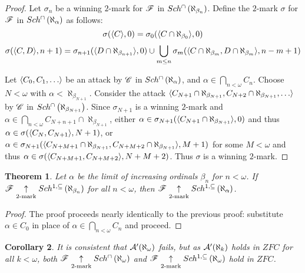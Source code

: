 \documentclass{amsart}
\theoremstyle{plain}
\newtheorem{theorem}{Theorem}
\newtheorem{corollary}[theorem]{Corollary}
\theoremstyle{definition}
\theoremstyle{remark}
\theoremstyle{plain}
\theoremstyle{definition}
\theoremstyle{remark}
\begin{document}
  \begin{proof}
    Let \(\sigma_n\) be a winning \(2\)-mark for \(\mathscr{F}\) in
    \(Sch^{\cap}\left({\aleph_{\beta_n}}\right)\). Define the \(2\)-mark \(\sigma\)
    for \(\mathscr{F}\) in \(Sch^{\cap}\left({\aleph_\alpha}\right)\) as follows:
    \[
      \sigma(\langle C\rangle,0)
        =
      \sigma_0(\langle C\cap\aleph_{\beta_0}\rangle,0)
    \]
    \[
      \sigma(\langle C,D\rangle,n+1)
        =
      \sigma_{n+1}(\langle D\cap\aleph_{\beta_{n+1}}\rangle,0)
        \cup
      \bigcup_{m\leq n}
      \sigma_m(\langle C\cap\aleph_{\beta_m},D\cap\aleph_{\beta_m}\rangle,n-m+1)
    \]

    Let \(\<C_0,C_1,\dots\>\) be an attack by
    \(\mathscr{C}\) in \(Sch^{\cap}\left({\aleph_\alpha}\right)\), and
    \(\alpha\in\bigcap_{n<\omega}C_n\).
    Choose \(N<\omega\) with \(\alpha<\aleph_{\beta_{N+1}}\). Consider the
    attack
    \(\<C_{N+1}\cap\aleph_{\beta_{N+1}},C_{N+2}\cap\aleph_{\beta_{N+1}},\dots\>\)
    by \(\mathscr{C}\) in \(Sch^{\cap}\left({\aleph_{\beta_{N+1}}}\right)\). Since
    \(\sigma_{N+1}\) is a winning \(2\)-mark and
    \(\alpha\in\bigcap_{n<\omega}C_{N+n+1}\cap\aleph_{\beta_{N+1}}\), either
    \(\alpha\in\sigma_{N+1}(\langle C_{N+1}\cap\aleph_{\beta_{N+1}}\rangle,0)\) and thus
    \(\alpha\in\sigma(\langle C_N,C_{N+1}\rangle,N+1)\), or
    \(
      \alpha
        \in
      \sigma_{N+1}(
        \langle C_{N+M+1}\cap\aleph_{\beta_{N+1}},C_{N+M+2}\cap\aleph_{\beta_{N+1}}\rangle
        ,M+1
      )
    \)
    for some \(M<\omega\) and thus
    \(
      \alpha
        \in
      \sigma(
        \langle C_{N+M+1},C_{N+M+2}\rangle,
        N+M+2
      )
    \). Thus \(\sigma\) is a winning \(2\)-mark.
  \end{proof}

  \begin{theorem}
    Let \(\alpha\) be the limit of increasing ordinals \(\beta_n\) for \(n<\omega\).
    If \(\mathscr{F} \underset{2\text{-mark}}{\uparrow}Sch^{1,\subseteq}\left({\aleph_{\beta_n}}\right)\) for all
    \(n<\omega\), then \(\mathscr{F}\underset{2\text{-mark}}{\uparrow}Sch^{1,\subseteq}\left({\aleph_\alpha}\right)\).
  \end{theorem}

  \begin{proof}
    The proof proceeds nearly identically to the previous proof: substitute
    \(\alpha\in C_0\) in place of \(\alpha\in\bigcap_{n<\omega}C_n\) and proceed.
  \end{proof}

  \begin{corollary}
    It is consistent that \(\mathcal{A}'(\aleph_\omega)\) fails,
    but as \(\mathcal{A}'(\aleph_k)\) holds in \(ZFC\) for all \(k<\omega\),
    both
    \(\mathscr{F}\underset{2\text{-mark}}{\uparrow}Sch^{\cap}\left({\aleph_\omega}\right)\) and
    \(\mathscr{F}\underset{2\text{-mark}}{\uparrow}Sch^{1,\subseteq}\left({\aleph_\omega}\right)\) hold in \(ZFC\).
  \end{corollary}
\end{document}
